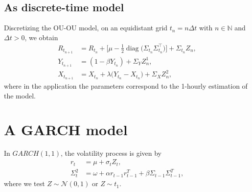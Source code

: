 \documentclass[11pt]{article}
\newcommand{\N}{\mathbb{N}}
\newcommand{\cN}{\mathcal{N}}
\DeclareMathOperator{\diag}{diag}
\theoremstyle{plain}
\theoremstyle{definition}
\begin{document}
\subsection{As discrete-time model}
Discretizing the OU-OU model, on an equidistant grid $t_{n} = n\Delta t$ with $n\in \N$ and $\Delta t > 0$, we obtain
\begin{align}
    R_{t_{n+1}} &= R_{t_{n}} + \bigl[\mu - \frac{1}{2}\diag\bigl(\Sigma_{t_{n}}\Sigma_{t_{n}}^{\top}\bigr)\bigr] + \Sigma_{t_{n}}Z_{n},\\
    Y_{t_{n+1}} &= (1-\beta Y_{t_{n}})  + \Sigma_{Y}Z^{1}_{n},\\
    X_{t_{n+1}} &= X_{t_{n}} + \lambda\bigl(Y_{t_{n}} - X_{t_{n}}\bigr) + \Sigma_{X}Z^{2}_{n},
\end{align}
where in the application the parameters correspond to the 1-hourly estimation of the model.

\section{A GARCH model}
In $GARCH(1,1)$, the volatility process is given by
\begin{align*}
    r_{t} &= \mu + \sigma_{t}Z_{t},\\
    \Sigma_{t}^{2} &= \omega + \alpha r_{t-1} r_{t-1}^{T} + \beta \Sigma_{t-1}\Sigma_{t-1}^{T},
\end{align*}
where we test $Z\sim \cN(0,1)$ or $Z\sim t_{1}$.





\end{document}
